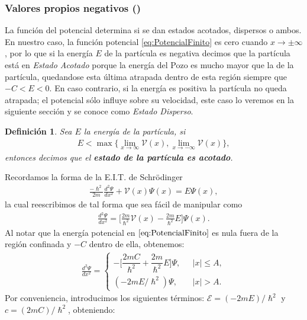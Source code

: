 \documentclass[12pt]{article}
\newtheorem{defn}[teo]{Definición}
\theoremstyle{definition}
\begin{document}
\subsubsection{Valores propios negativos ()}
\noindent
La función del potencial determina si se dan estados acotados, dispersos o ambos. En nuestro caso, la función potencial \eqref{eq:PotencialFinito} es cero cuando $x \rightarrow\pm\infty$, por lo que si la energía $E$ de la partícula es negativa decimos que la partícula está en  \textit{Estado Acotado} porque la energía del Pozo es mucho mayor que la de la partícula, quedandose esta última atrapada dentro de esta región siempre que $-C<E<0$. En caso contrario, si la energía es positiva la partícula no queda atrapada; el potencial sólo influye sobre su velocidad, este caso lo veremos en la siguiente sección y se conoce como \textit{Estado Disperso}.
\begin{defn}
    Sea $E$ la energía de la partícula, si
    \begin{align*}
        E < \max\bigg\{\lim_{x\to\infty} \mathcal{V}(x), \lim_{x\to-\infty} \mathcal{V}(x)\bigg\},
    \end{align*}
    entonces decimos que el \textbf{estado de la partícula es acotado}. 
\end{defn}
\noindent
Recordamos la forma de la E.I.T. de Schrödinger
\begin{align*}
    \frac{-\hslash^2}{2m}\frac{d^2\Psi}{dx^2} +  \mathcal{V}(x)\Psi(x) = E\Psi(x),
\end{align*}
la cual reescribimos de tal forma que sea fácil de manipular como
\begin{align*}
    \frac{d^2\Psi}{dx^2} = \bigg[\frac{2m}{\hslash^2}\mathcal{V}(x)-\frac{2m}{\hslash^2}E\bigg]\Psi(x).
\end{align*}
Al notar que la energía potencial en $\eqref{eq:PotencialFinito}$ es nula fuera de la región confinada y $-C$ dentro de ella, obtenemos:
\begin{align*}
        \frac{d^2\Psi}{dx^2}=  
        \left\{ \begin{array}{ll}
        -\bigg[\dfrac{2mC}{\hslash^2}+\dfrac{2m}{\hslash^2}E\bigg]\Psi, \:\:\:  &|x| \leq A,
        \\
        (-2mE/\hslash^2)\Psi, \:\:\: &|x| > A.
        \end{array}
        \right.
\end{align*}
Por conveniencia, introducimos los siguientes términos: $\mathcal{E} = (-2mE)/\hslash^2$ y \\ $c = (2mC)/\hslash^2$, obteniendo:
\end{document}
